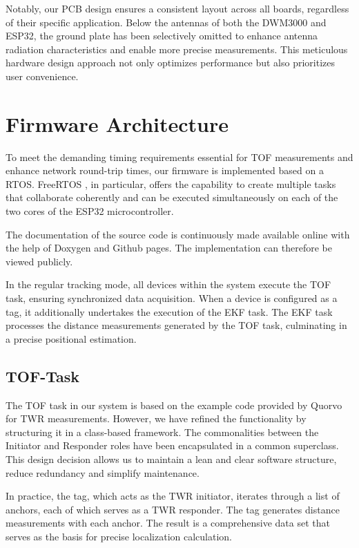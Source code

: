 \documentclass[conference, a4paper]{IEEEtran}
\begin{document}
Notably, our PCB design ensures a consistent layout across all boards,
regardless of their specific application.
Below the antennas of both the DWM3000 and ESP32,
the ground plate has been selectively omitted to enhance antenna radiation
characteristics and enable more precise measurements.
This meticulous hardware design approach not only optimizes
performance but also prioritizes user convenience. 


\section{Firmware Architecture}\label{section:firmware}
To meet the demanding timing requirements essential for \ac{TOF}
measurements and enhance network round-trip times,
our firmware is implemented based on a \ac{RTOS}.
FreeRTOS \cite{FreeRTOS_2023}, in particular,
offers the capability to create multiple tasks that collaborate coherently
and can be executed simultaneously on each of the two cores of the ESP32 microcontroller.

The documentation of the source code is continuously made available online with the help of Doxygen and Github pages.
The implementation can therefore be viewed publicly\cite{doxygen-doku}.

In the regular tracking mode,
all devices within the system execute the TOF task, ensuring synchronized data acquisition.
When a device is configured as a tag,
it additionally undertakes the execution of the \ac{EKF} task.
The \ac{EKF} task processes the distance measurements generated by the TOF task,
culminating in a precise positional estimation.

\subsection{TOF-Task}\label{section:firmware-tof}
The \ac{TOF} task in our system is based on the example code
provided by Quorvo for \ac{TWR} measurements.
However, we have refined the functionality by structuring it in a class-based framework.
The commonalities between the Initiator and Responder roles have been
encapsulated in a common superclass.
This design decision allows us to maintain a lean and clear software structure,
reduce redundancy and simplify maintenance.

In practice, the tag, which acts as the \ac{TWR} initiator,
iterates through a list of anchors, each of which serves as a \ac{TWR} responder.
The tag generates distance measurements with each anchor.
The result is a comprehensive data set that serves as the basis for precise localization calculation.
\end{document}
